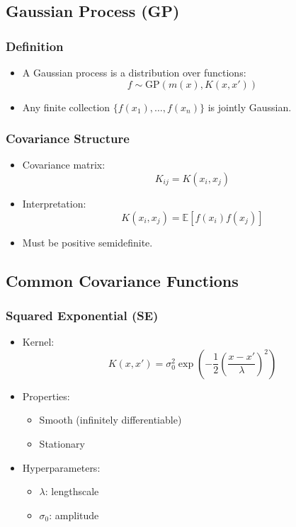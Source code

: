 \documentclass[12pt,oneside]{book}
\numberwithin{equation}{section}
\theoremstyle{definition}
\theoremstyle{plain}
\theoremstyle{remark}
\begin{document}
\subsection{Gaussian Process (GP)}

\subsubsection*{Definition}
\begin{itemize}
\item A Gaussian process is a distribution over functions:
\[
f \sim \mathrm{GP}(m(x), K(x,x'))
\]

\item Any finite collection $\{f(x_1), \ldots, f(x_n)\}$ is jointly Gaussian.
\end{itemize}

\subsubsection*{Covariance Structure}
\begin{itemize}
\item Covariance matrix:
\[
K_{ij} = K(x_i, x_j)
\]

\item Interpretation:
\[
K(x_i, x_j) = \mathbb{E}[f(x_i) f(x_j)]
\]

\item Must be positive semidefinite.
\end{itemize}

\subsection{Common Covariance Functions}

\subsubsection*{Squared Exponential (SE)}
\begin{itemize}
\item Kernel:
\[
K(x,x') = \sigma_0^2 \exp\left(-\frac{1}{2}\left(\frac{x-x'}{\lambda}\right)^2\right)
\]

\item Properties:
\begin{itemize}
\item Smooth (infinitely differentiable)
\item Stationary
\end{itemize}

\item Hyperparameters:
\begin{itemize}
\item $\lambda$: lengthscale
\item $\sigma_0$: amplitude
\end{itemize}
\end{itemize}
\end{document}
